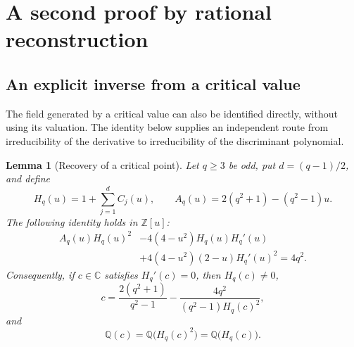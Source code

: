 \documentclass[11pt,a4paper]{article}
\newtheorem{lemma}[theorem]{Lemma}
\theoremstyle{definition}
\theoremstyle{remark}
\newcommand{\QQ}{\mathbb Q}
\newcommand{\ZZ}{\mathbb Z}
\newcommand{\CC}{\mathbb C}
\begin{document}
\section{A second proof by rational reconstruction}\label{sec:inverse}

\subsection{An explicit inverse from a critical value}
\label{subsec:critical-value-inverse}

The field generated by a critical value can also be identified directly,
without using its valuation.  The identity below supplies an independent
route from irreducibility of the derivative to irreducibility of the
discriminant polynomial.

\begin{lemma}[Recovery of a critical point]
\label{lem:critical-value-inverse}
Let $q\geq 3$ be odd, put $d=(q-1)/2$, and define
\[
 H_q(u)=1+\sum_{j=1}^{d}C_j(u),
 \qquad
 A_q(u)=2(q^2+1)-(q^2-1)u.
\]
The following identity holds in $\ZZ[u]$:
\begin{equation}
\label{eq:critical-value-polynomial-identity}
 \begin{split}
 A_q(u)H_q(u)^2
 &-4(4-u^2)H_q(u)H_q'(u)\\
 &+4(4-u^2)(2-u)H_q'(u)^2
 =4q^2.
 \end{split}
\end{equation}
Consequently, if $c\in\CC$ satisfies $H_q'(c)=0$, then $H_q(c)\neq 0$,
\begin{equation}
\label{eq:critical-value-rational-inverse}
 c=\frac{2(q^2+1)}{q^2-1}
   -\frac{4q^2}{(q^2-1)H_q(c)^2},
\end{equation}
and
\begin{equation}
\label{eq:critical-value-field-equality}
 \QQ(c)=\QQ\bigl(H_q(c)^2\bigr)=\QQ\bigl(H_q(c)\bigr).
\end{equation}
\end{lemma}
\end{document}
